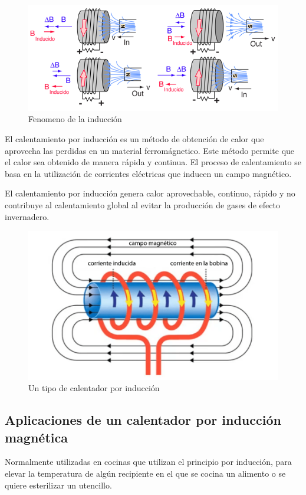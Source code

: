 \documentclass[12pt]{article}
\begin{document}
\begin{figure}[H]
\centering
\includegraphics[scale=1.9]{src/images/Induccion.png}
\caption{Fenomeno de la inducción}
\label{fgr:Induccion}
\end{figure}

El calentamiento por inducción es un método de obtención de calor que aprovecha las perdidas en un material ferromágnetico. Este método permite que el calor sea obtenido de manera rápida y continua. El proceso de calentamiento se basa en la utilización de corrientes eléctricas que inducen un campo magnético.

El calentamiento por inducción genera calor aprovechable, continuo, rápido y no contribuye al
calentamiento global al evitar la producción de gases de efecto invernadero.

\begin{figure}[H]
\centering
\includegraphics[scale=0.27]{src/images/Calentador_por_induccion.png}
\caption{Un tipo de calentador por inducción}
\label{fgr:Calentador_por_induccion}
\end{figure}

\subsection{Aplicaciones de un calentador por inducción magnética}
Normalmente utilizadas en cocinas que utilizan el principio por inducción, para elevar la temperatura de algún recipiente en el que se cocina un alimento o se quiere esterilizar un utencillo.
\end{document}
